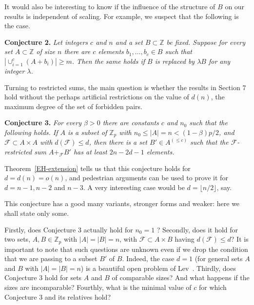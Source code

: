 \documentclass[12pt,reqno]{amsart}
\theoremstyle{definition}
\renewcommand\le{\leqslant}
\renewcommand\ge{\geqslant}
\begin{document}
\vspace{5pt}
It would also be interesting to know if the influence of the structure of $B$ on our results is
independent of scaling. For example, we suspect that the following is the case.

\vspace{5pt}
{\bf Conjecture 2. }{\em
  Let integers $c$ and $n$  and a set $B\subset {\mathbb Z}$ be fixed. Suppose for every set
$A\subset {\mathbb Z}$ of size $n$ there are
$c$ elements $b_1, \dots , b_c \in B$ such that $|\cup_{i=1}^c (A+b_i)|\ge m$. Then the same holds if
$B$ is replaced by
$\lambda B$ for any integer $\lambda$.
}


\vspace{10pt}
Turning to restricted sums, the main question is whether the results in Section 7 hold without the perhaps
artificial restrictions on the value of $d(n)$, the maximum degree of the set of forbidden pairs.

\vspace{5pt}
{\bf Conjecture 3. }{\em
  For every $\beta>0$ there
  are constants $c$ and $n_0$ such that the following holds. If $A$ is a subset of ${\mathbb Z}_p$ with
  $n_0 \le |A|=n < (1-\beta)p/2$, and ${\mathcal F} \subset A \times A$ with $d({\mathcal F}) \le d$, then there is a set $B'\in A^{(\le c)}$ such that the ${\mathcal F}$-restricted sum $A+_{{\mathcal F}} B'$ has at least $2n-2d-1$ elements.
}

\vspace{10pt}
Theorem~\ref{EH-extension} tells us that this conjecture holds for $d=d(n)=o(n)$, and
pedestrian arguments can be used to prove it for $d=n-1, n-2$ and $n-3$. A very
interesting case would be $d=\lfloor n/2 \rfloor$, say.

\vspace{10pt}
This conjecture has a good many variants, stronger forms and weaker: here we shall state only some.


\vspace{10pt}
Firstly, does Conjecture 3 actually hold for $n_0=1$ ?
Secondly, does it hold for two sets, $A, B \in {\mathbb Z}_p$ with $|A|=|B|=n$, with
${\mathcal F} \subset A \times B$ having $d({\mathcal F}) \le d$?
It is important to note that such questions are unknown even if we drop the condition that we are passing to a subset $B'$ of $B$. Indeed, the case $d=1$ (for general sets $A$ and $B$ with $|A|=|B|=n$) is
a beautiful open problem of Lev~\cite{Lev-00b}.
Thirdly, does Conjecture 3 hold for
sets $A$ and $B$ of comparable sizes? And what happens if the sizes are incomparable?
Fourthly, what is the minimal value of $c$ for which Conjecture 3 and its relatives hold?
\end{document}
